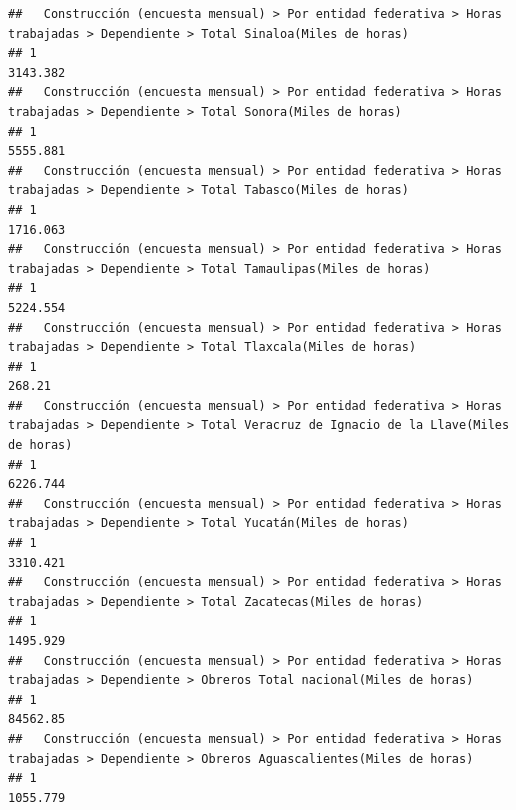\documentclass[
]{article}
\begin{document}
\begin{verbatim}
##   Construcción (encuesta mensual) > Por entidad federativa > Horas trabajadas > Dependiente > Total Sinaloa(Miles de horas) 
## 1                                                                                                                   3143.382
##   Construcción (encuesta mensual) > Por entidad federativa > Horas trabajadas > Dependiente > Total Sonora(Miles de horas) 
## 1                                                                                                                  5555.881
##   Construcción (encuesta mensual) > Por entidad federativa > Horas trabajadas > Dependiente > Total Tabasco(Miles de horas) 
## 1                                                                                                                   1716.063
##   Construcción (encuesta mensual) > Por entidad federativa > Horas trabajadas > Dependiente > Total Tamaulipas(Miles de horas) 
## 1                                                                                                                      5224.554
##   Construcción (encuesta mensual) > Por entidad federativa > Horas trabajadas > Dependiente > Total Tlaxcala(Miles de horas) 
## 1                                                                                                                      268.21
##   Construcción (encuesta mensual) > Por entidad federativa > Horas trabajadas > Dependiente > Total Veracruz de Ignacio de la Llave(Miles de horas) 
## 1                                                                                                                                           6226.744
##   Construcción (encuesta mensual) > Por entidad federativa > Horas trabajadas > Dependiente > Total Yucatán(Miles de horas) 
## 1                                                                                                                   3310.421
##   Construcción (encuesta mensual) > Por entidad federativa > Horas trabajadas > Dependiente > Total Zacatecas(Miles de horas) 
## 1                                                                                                                     1495.929
##   Construcción (encuesta mensual) > Por entidad federativa > Horas trabajadas > Dependiente > Obreros Total nacional(Miles de horas) 
## 1                                                                                                                            84562.85
##   Construcción (encuesta mensual) > Por entidad federativa > Horas trabajadas > Dependiente > Obreros Aguascalientes(Miles de horas) 
## 1                                                                                                                            1055.779

\end{verbatim}
\end{document}
